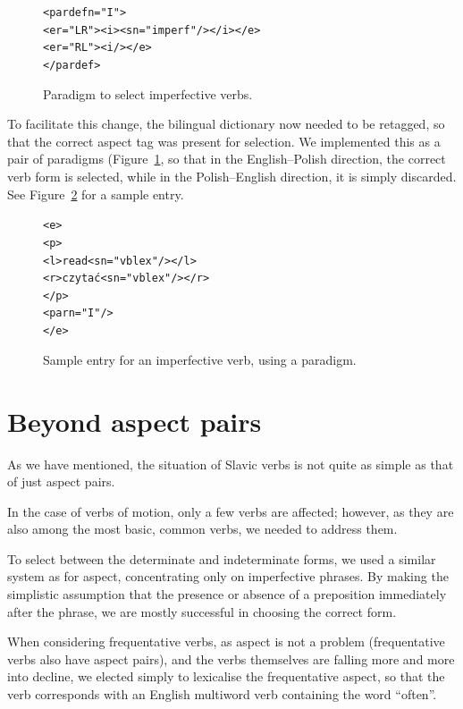 \documentclass[11pt]{article}
\begin{document}
\begin{figure}[p]
\begin{small}
\begin{alltt}
<pardef n="I">
  <e r="LR"><i><s n="imperf"/></i></e>
  <e r="RL"><i/></e>
</pardef>
\end{alltt}
\end{small}
\caption{Paradigm to select imperfective verbs.}
\label{figure:pardef}
\end{figure}

To facilitate this change, the bilingual dictionary now needed to be
retagged, so that the correct aspect tag was present for selection. We
implemented this as a pair of paradigms (Figure~\ref{figure:pardef}, so that in the English--Polish
direction, the correct verb form is selected, while in the 
Polish--English direction, it is simply discarded. See Figure~\ref{figure:entry}
for a sample entry.

\begin{figure}[p]
\begin{small}
\begin{alltt}
<e>
  <p>
    <l>read<s n="vblex"/></l>
    <r>czyta{\'{c}}<s n="vblex"/></r>
  </p>
  <par n="I"/>
</e>
\end{alltt}
\end{small}
\caption{Sample entry for an imperfective verb, using a paradigm.}
\label{figure:entry}
\end{figure}

\section{Beyond aspect pairs}

As we have mentioned, the situation of Slavic verbs is not quite as
simple as that of just aspect pairs.

In the case of verbs of motion, only a few verbs are affected; however,
as they are also among the most basic, common verbs, we needed to 
address them. 

To select between the determinate and indeterminate forms, we used a
similar system as for aspect, concentrating only on imperfective
phrases. By making the simplistic assumption that the presence or
absence of a preposition immediately after the phrase, we are mostly
successful in choosing the correct form.

When considering frequentative verbs, as aspect is not a problem
(frequentative verbs also have aspect pairs), and the verbs themselves
are falling more and more into decline, we elected simply to lexicalise
the frequentative aspect, so that the verb corresponds with an English
multiword verb containing the word ``often''.\\ 
\end{document}
